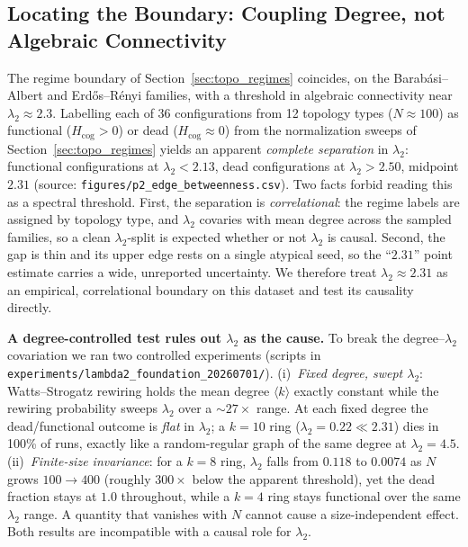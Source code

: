 ﻿\documentclass[11pt]{article}
\begin{document}
\subsection{Locating the Boundary: Coupling Degree, not Algebraic Connectivity}
\label{sec:lambda2}

The regime boundary of Section~\ref{sec:topo_regimes} coincides, on the Barab\'asi--Albert and Erd\H{o}s--R\'enyi families, with a threshold in algebraic connectivity near $\lambda_2 \approx 2.3$. Labelling each of 36 configurations from 12 topology types ($N \approx 100$) as functional ($H_{\mathrm{cog}} > 0$) or dead ($H_{\mathrm{cog}} \approx 0$) from the normalization sweeps of Section~\ref{sec:topo_regimes} yields an apparent \emph{complete separation} in $\lambda_2$: functional configurations at $\lambda_2 < 2.13$, dead configurations at $\lambda_2 > 2.50$, midpoint $2.31$ (source: \texttt{figures/p2\_edge\_betweenness.csv}). Two facts forbid reading this as a spectral threshold. First, the separation is \emph{correlational}: the regime labels are assigned by topology type, and $\lambda_2$ covaries with mean degree across the sampled families, so a clean $\lambda_2$-split is expected whether or not $\lambda_2$ is causal. Second, the gap is thin and its upper edge rests on a single atypical seed, so the ``$2.31$'' point estimate carries a wide, unreported uncertainty. We therefore treat $\lambda_2 \approx 2.31$ as an empirical, correlational boundary on this dataset and test its causality directly.

\textbf{A degree-controlled test rules out $\lambda_2$ as the cause.} To break the degree--$\lambda_2$ covariation we ran two controlled experiments (scripts in \texttt{experiments/lambda2\_foundation\_20260701/}). (i)~\emph{Fixed degree, swept $\lambda_2$}: Watts--Strogatz rewiring holds the mean degree $\langle k\rangle$ exactly constant while the rewiring probability sweeps $\lambda_2$ over a ${\sim}27\times$ range. At each fixed degree the dead/functional outcome is \emph{flat} in $\lambda_2$; a $k=10$ ring ($\lambda_2 = 0.22 \ll 2.31$) dies in 100\% of runs, exactly like a random-regular graph of the same degree at $\lambda_2 = 4.5$. (ii)~\emph{Finite-size invariance}: for a $k=8$ ring, $\lambda_2$ falls from $0.118$ to $0.0074$ as $N$ grows $100 \to 400$ (roughly $300\times$ below the apparent threshold), yet the dead fraction stays at $1.0$ throughout, while a $k=4$ ring stays functional over the same $\lambda_2$ range. A quantity that vanishes with $N$ cannot cause a size-independent effect. Both results are incompatible with a causal role for $\lambda_2$.
\end{document}
